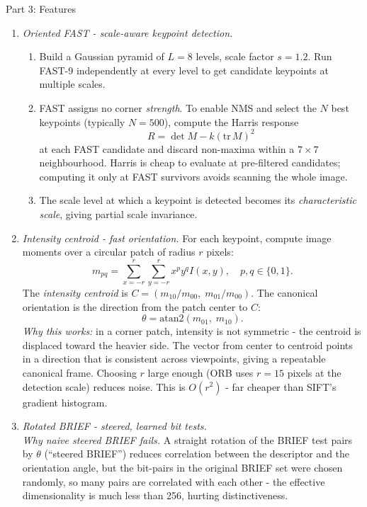 \documentclass[letterpaper]{article}
\begin{document}
\begin{notes}{Part 3: Features}
\begin{enumerate}
    \item \textit{Oriented FAST - scale-aware keypoint detection.}
    \begin{enumerate}
        \item Build a Gaussian pyramid of $L=8$ levels, scale factor $s=1.2$. Run FAST-9 independently at every level to get candidate keypoints at multiple scales.
        \item FAST assigns no corner \emph{strength}. To enable NMS and select the $N$ best keypoints (typically $N=500$), compute the Harris response 
        $$R = \det M - k(\mathrm{tr}\,M)^2$$ 
        at each FAST candidate and discard non-maxima within a $7\times7$ neighbourhood. Harris is cheap to evaluate at pre-filtered candidates; computing it only at FAST survivors avoids scanning the whole image.
        \item The scale level at which a keypoint is detected becomes its \emph{characteristic scale}, giving partial scale invariance.
    \end{enumerate}

    \item \textit{Intensity centroid - fast orientation.} For each keypoint, compute image moments over a circular patch of radius $r$ pixels:
    $$m_{pq} = \sum_{x=-r}^{r}\sum_{y=-r}^{r} x^p y^q I(x,y), \quad p,q \in \{0,1\}.$$
    The \emph{intensity centroid} is $C = (m_{10}/m_{00},\; m_{01}/m_{00})$. The canonical orientation is the direction from the patch center to $C$:
    $$\theta = \mathrm{atan2}(m_{01},\; m_{10}).$$
    \emph{Why this works:} in a corner patch, intensity is not symmetric - the centroid is displaced toward the heavier side. The vector from center to centroid points in a direction that is consistent across viewpoints, giving a repeatable canonical frame. Choosing $r$ large enough (ORB uses $r=15$ pixels at the detection scale) reduces noise. This is $O(r^2)$ - far cheaper than SIFT's gradient histogram.

    \item \textit{Rotated BRIEF - steered, learned bit tests.}\\
    \emph{Why naive steered BRIEF fails.} A straight rotation of the BRIEF test pairs by $\theta$ (``steered BRIEF'') reduces correlation between the descriptor and the orientation angle, but the bit-pairs in the original BRIEF set were chosen randomly, so many pairs are correlated with each other - the effective dimensionality is much less than 256, hurting distinctiveness.\\
    

\end{enumerate}
\end{notes}
\end{document}
